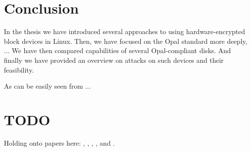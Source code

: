 


\usetikzlibrary{positioning}













\chapter{Conclusion}

In the thesis we have introduced several approaches to using hardware-encrypted block devices in Linux. Then, we have focused on the Opal standard more deeply, ... We have then compared capabilities of several Opal-compliant disks. And finally we have provided an overview on attacks on such devices and their feasibility.

As can be easily seen from ...



\chapter{TODO}

Holding onto papers here: 
\cite{self_encrypting_deception},
\cite{self_decrypting_risks},
\cite{systematic_assessment_of_the_security},
\cite{got_hw_crypto}, and
\cite{bypassing_in_enterprise}.

\newpage

\printbibliography[heading=bibintoc] %



